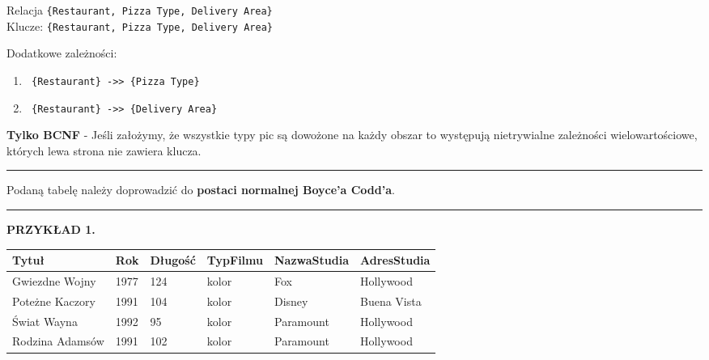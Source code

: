 \documentclass[a5paper,6pt]{article}
\newcommand{\horrule}[1]{\rule{\linewidth}{#1}}
\begin{document}
    \vskip 0.5cm
    Relacja \texttt{\{Restaurant, Pizza Type, Delivery Area\}}\\
    Klucze: \texttt{\{Restaurant, Pizza Type, Delivery Area\}}

    Dodatkowe zależności:
    \begin{enumerate}
        \item \texttt{ \{Restaurant\} ->> \{Pizza Type\}}
        \item \texttt{ \{Restaurant\} ->> \{Delivery Area\}}
    \end{enumerate}

    \begin{tcolorbox}
    \textbf{Tylko BCNF} - Jeśli założymy, że wszystkie typy pic są dowożone na
    każdy obszar to występują nietrywialne zależności wielowartościowe, których
    lewa strona nie zawiera klucza.
    \end{tcolorbox}

\pagebreak

    \horrule{0.5pt}
    Podaną tabelę należy doprowadzić do
    \textbf{postaci normalnej Boyce’a Codd’a}.\\
    \horrule{0.5pt}

    \vskip 0.5cm

    \textbf{PRZYKŁAD 1.}

    \vskip 0.5cm

\begin{adjustbox}{width=\columnwidth,center}
    \begin{tabular}{|l|l|l|l|l|l|}
        \hline
        \textbf{Tytuł} &
        \textbf{Rok} &
        \textbf{Długość} &
        \textbf{TypFilmu} &
        \textbf{NazwaStudia} &
        \textbf{AdresStudia}\\
        \hline
        Gwiezdne Wojny &
        1977 &
        124 &
        kolor &
        Fox &
        Hollywood \\
        \hline
        Poteżne Kaczory &
        1991 &
        104 &
        kolor &
        Disney &
        Buena Vista \\
        \hline
        Świat Wayna &
        1992 &
        95 &
        kolor &
        Paramount &
        Hollywood \\
        \hline
        Rodzina Adamsów &
        1991 &
        102 &
        kolor &
        Paramount &
        Hollywood \\
        \hline
        \end{tabular}
\end{adjustbox}
\end{document}
